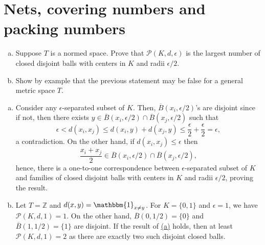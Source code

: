 \section{Nets, covering numbers and packing numbers}

\begin{problem*}[Exercise 4.2.5]\label{ex4.2.5}
	\begin{enumerate}[(a)]
		\item\label{ex4.2.5:a} Suppose \(T\) is a normed space. Prove that \(\mathcal{P} (K, d, \epsilon )\) is the largest number of closed disjoint balls with centers in \(K\) and radii \(\epsilon / 2\).
		\item\label{ex4.2.5:b} Show by example that the previous statement may be false for a general metric space \(T\).
	\end{enumerate}
\end{problem*}
\begin{answer}
	\begin{enumerate}[(a)]
		\item Consider any \(\epsilon \)-separated subset of \(K\). Then, \(\overline{B} (x_i, \epsilon / 2)\)'s are disjoint since if not, then there exists \(y \in \overline{B} (x_i , \epsilon / 2) \cap \overline{B} (x_j, \epsilon / 2)\) such that
		      \[
			      \epsilon < d(x_i, x_j) \leq d(x_i, y) + d(x_j , y) \leq \frac{\epsilon}{2} + \frac{\epsilon }{2} = \epsilon ,
		      \]
		      a contradiction. On the other hand, if \(d(x_i, x_j) \leq \epsilon \) then
		      \[
			      \frac{x_i + x_j}{2} \in \overline{B} (x_i, \epsilon / 2) \cap \overline{B} (x_j, \epsilon / 2),
		      \]
		      hence, there is a one-to-one correspondence between \(\epsilon \)-separated subset of \(K\) and families of closed disjoint balls with centers in \(K\) and radii \(\epsilon / 2\), proving the result.
		\item Let \(T = \mathbb{Z} \) and \(d(x, y) = \mathbbm{1}_{x \neq y} \). For \(K = \{ 0, 1 \} \) and \(\epsilon = 1\), we have \(\mathcal{P} (K, d, 1) = 1\). On the other hand, \(\overline{B} (0, 1 / 2) = \{ 0 \} \) and \(\overline{B} (1, 1 / 2) = \{ 1 \} \) are disjoint. If the result of \hyperref[ex4.2.5:a]{(a)} holds, then at least \(\mathcal{P} (K, d, 1) = 2\) as there are exactly two such disjoint closed balls.
	\end{enumerate}
\end{answer}

